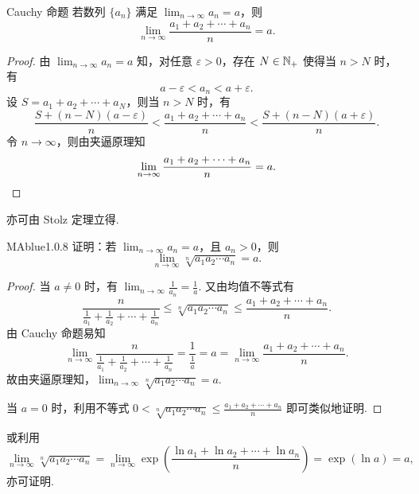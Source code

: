 \begin{center}
    \begin{minipage}{0.85\textwidth}
        \begin{theorem}{Cauchy 命题}{}
            若数列 $\{ a_n \}$ 满足 $\lim_{n \to \infty} a_n = a$，则
            \[
                \lim_{n \to \infty} \frac {a_1 + a_2 + \cdots + a_n} n = a.
            \]
            \tcblower
            \begin{proof}
                由 $\lim_{n \to \infty} a_n = a$ 知，对任意 $\varepsilon > 0$，存在 $N \in \mathbb N_+$ 使得当 $n > N$ 时，有
                \[
                    a - \varepsilon < a_n < a + \varepsilon.
                \]
                设 $S = a_1 + a_2 + \cdots + a_N$，则当 $n > N$ 时，有
                \[
                    \frac {S + (n-N)(a-\varepsilon)} n < \frac {a_1 + a_2 + \cdots + a_n} n < \frac {S + (n-N)(a+\varepsilon)} n.
                \]
                令 $n \to \infty$，则由夹逼原理知
                \[
                    \lim_{n \to \infty} \frac {a_1 + a_2 + \cdots + a_n} n = a. \qedhere
                \]
            \end{proof}
            亦可由 Stolz 定理立得.
        \end{theorem}
    \end{minipage}
\end{center}

\begin{problem}{MAblue}{1.0.8}
    证明：若 $\lim_{n \to \infty} a_n = a$，且 $a_n > 0$，则
    \[
        \lim_{n \to \infty} \sqrt[n]{a_1 a_2 \cdots a_n} = a.
    \]
\end{problem}

\begin{proof}
    当 $a \neq 0$ 时，有 $\lim_{n \to \infty} \frac 1 {a_n} = \frac 1 a$. 又由均值不等式有
    \[
        \frac{n}{\frac 1 {a_1} + \frac 1 {a_2} + \cdots + \frac 1 {a_n}} \leqslant \sqrt[n]{a_1a_2\cdots a_n} \leqslant \frac {a_1+a_2+\cdots+a_n} n.
    \]
    由 Cauchy 命题易知
    \[
        \lim_{n \to \infty} \frac{n}{\frac 1 {a_1} + \frac 1 {a_2} + \cdots + \frac 1 {a_n}} = \frac 1 {\frac 1 a} = a = \lim_{n \to \infty} \frac {a_1+a_2+\cdots+a_n} n.
    \]
    故由夹逼原理知，$\lim_{n \to \infty} \sqrt[n]{a_1a_2\cdots a_n} = a$.
    
    {\flushleft 当 $a = 0$ 时，利用不等式 $0 < \sqrt[n]{a_1a_2\cdots a_n} \leqslant \frac {a_1+a_2+\cdots+a_n} n$ 即可类似地证明.}
\end{proof}

{\flushleft 或利用}
\[
    \lim_{n \to \infty} \sqrt[n]{a_1 a_2 \cdots a_n} = \lim_{n \to \infty} \exp\left( \frac {\ln a_1 + \ln a_2 + \cdots + \ln a_n} n \right) = \exp(\ln a) = a,
\]
亦可证明.

